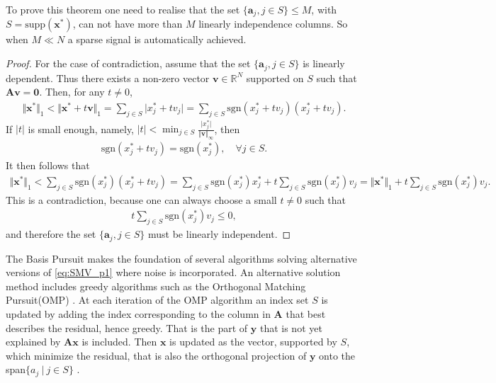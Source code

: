 To prove this theorem one need to realise that the set $\lbrace \mathbf{a}_j, j \in S \rbrace \leq M$, with $S = \text{supp}(\mathbf{x}^\ast)$, can not have more than $M$ linearly independence columns. 
So when $M \ll N$ a sparse signal is automatically achieved.
\begin{proof}
For the case of contradiction, assume that the set $\lbrace \mathbf{a}_j, j \in S \rbrace$ is linearly dependent. 
Thus there exists a non-zero vector $\mathbf{v} \in \mathbb{R}^N$ supported on $S$ such that $\mathbf{Av} = \textbf{0}$. Then, for any $t \neq 0$,
\begin{align*}
\Vert \mathbf{x}^\ast \Vert_1 < \Vert \mathbf{x}^\ast + t \mathbf{v} \Vert_1 = \sum_{j \in S} \vert x_j^\ast + t v_j \vert = \sum_{j \in S} \text{sgn}(x_j^\ast + t v_j )(x_j^\ast + t v_j ).
\end{align*}
If $|t|$ is small enough, namely, $|t| < \min_{j \in S} \frac{\vert x_j^\ast \vert}{\Vert \mathbf{v} \Vert_{\infty}}$, then
\begin{align*}
\text{sgn}(x_j^\ast + t v_j) = \text{sgn}(x_j^\ast), \quad \forall j \in S.
\end{align*}
It then follows that
\begin{align*}
\Vert \textbf{x}^{\ast} \Vert_1 < \sum_{j \in S} \text{sgn}(x_j^{\ast})(x_j^{\ast} + t v_j ) = \sum_{j \in S} \text{sgn}(x_j^{\ast})x_j^{\ast} + t \sum_{j \in S} \text{sgn}(x_j^{\ast})v_j = \Vert \textbf{x}^{\ast} \Vert_1 + t \sum_{j \in S} \text{sgn}(x_j^{\ast})v_j.
\end{align*}
This is a contradiction, because one can always choose a small $t \neq 0$ such that 
\begin{align*}
t \sum_{j \in S} \text{sgn}(x_j^\ast)v_j \leq 0,
\end{align*}
and therefore the set $\lbrace \mathbf{a}_j, j \in S \rbrace$ must be linearly independent.
\end{proof}
The Basis Pursuit makes the foundation of several algorithms solving alternative versions of \eqref{eq:SMV_p1} where noise is incorporated. 
An alternative solution method includes greedy algorithms such as the Orthogonal Matching Pursuit(OMP) \cite[P. 65]{FR}. 
At each iteration of the OMP algorithm an index set $S$ is updated by adding the index corresponding to the column in $\mathbf{A}$ that best describes the residual, hence greedy.
That is the part of $\mathbf{y}$ that is not yet explained by $\mathbf{Ax}$ is included. 
Then $\mathbf{x}$ is updated as the vector, supported by $S$, which minimize the residual, that is also the orthogonal projection of $\mathbf{y}$ onto the span$\lbrace a_j \ \vert \ j \in S \rbrace$ . 
